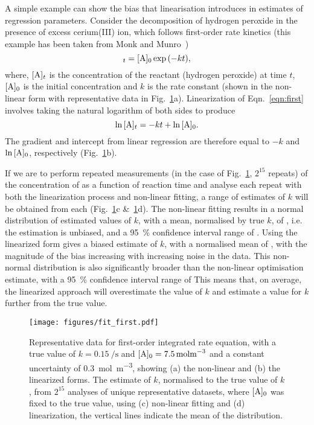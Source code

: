 \documentclass[journal=jacsat,manuscript=article]{achemso}
\begin{document}
A simple example can show the bias that linearisation introduces in estimates of regression parameters. 
Consider the decomposition of hydrogen peroxide  in the presence of excess cerium(III) ion, which follows first-order rate kinetics (this example has been taken from Monk and Munro~\cite{monk_math_2010})
%
\begin{equation}
    [\ce{A}]_t = [\ce{A}]_0\exp{(-kt)},
    \label{eqn:first}
\end{equation}
%
where, $[\ce{A}]_t$ is the concentration of the reactant  (hydrogen peroxide) at time $t$, $[\ce{A}]_0$ is the initial concentration and $k$ is the rate constant (shown in the non-linear form with representative data in Fig.~\ref{fig:fit_first}a).
Linearization of Eqn.~\ref{eqn:first} involves taking the natural logarithm of both sides to produce
%
\begin{equation}
    \ln{[\ce{A}]_t} = -kt + \ln{[\ce{A}]_0}.
\end{equation}
%
The gradient and intercept from linear regression are therefore equal to $-k$ and $\ln{[\ce{A}]_0}$, respectively (Fig.~\ref{fig:fit_first}b).

If we are to perform repeated measurements (in the case of Fig.~\ref{fig:fit_first}, $2^{15}$ repeats) of the concentration of  as a function of reaction time and analyse each repeat with both the linearization process and non-linear fitting, a range of estimates of $k$ will be obtained from each (Fig.~\ref{fig:fit_first}c \&~\ref{fig:fit_first}d).
The non-linear fitting results in a normal distribution of estimated values of $k$, with a mean, normalised by true $k$, of , i.e. the estimation is unbiased, and a \SI{95}{\percent} confidence interval range of .
Using the linearized form gives a biased estimate of $k$, with a normalised mean of , with the magnitude of the bias increasing with increasing noise in the data.
This non-normal distribution is also significantly broader than the non-linear optimisation estimate, with a \SI{95}{\percent} confidence interval range of 
This means that, on average, the linearized approach will overestimate the value of $k$ and estimate a value for $k$ further from the true value. 
%
\begin{figure}
  \texttt{[image: figures/fit\_first.pdf]}
  \caption{
    Representative data for first-order integrated rate equation, with a true value of $k=\SI{0.15}{\per\second}$ and $[\ce{A}]_0=\SI{7.5}{\mol\m^{-3}}$ and a constant uncertainty of \SI{0.3}{\mol\m^{-3}}, showing (a) the non-linear and (b) the linearized forms. 
    The estimate of $k$, normalised to the true value of $k$, from $2^{15}$ analyses of unique representative datasets, where $[\ce{A}]_0$ was fixed to the true value, using (c) non-linear fitting and (d) linearization, the vertical lines indicate the mean of the distribution. 
    }
  \label{fig:fit_first}
\end{figure}
%
\end{document}

